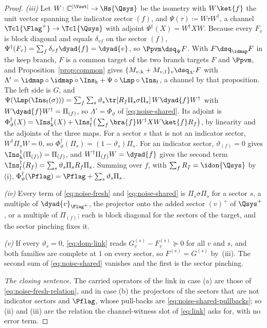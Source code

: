 \begin{proof}
\emph{(iii)} Let $W\colon\mathbb{C}^{|\Vset|}\to\Hs{\Qsys}$ be the isometry with
$W\ket{f}$ the unit vector spanning the indicator sector $(f)$, and
$\Psi(\tau)\coloneqq W\tau W^{\dagger}$, a channel
$\Tcl{\Flag^{+}}\to\Tcl{\Qsys}$ with adjoint $\Psi^{\dagger}(X)=W^{\dagger}XW$.
Because every $F_v$ is block diagonal and equals $\delta_{vf}$ on the sector
$(f)$, $\Psi^{\dagger}(F_v)=\sum_f\delta_{vf}\dyad{f}=\dyad{v}$, so
$\Ppvm\dsq_{\Psi}F$. With $F\dsq_{\idmap}F$ in the keep branch, $F$ is a
common target of the two branch targets $F$ and $\Ppvm$, and
Proposition~\ref{prop:common} gives
$\{M_{v,\mathrm{k}}+M_{v,\mathrm{f}}\}_v\dsq_{\Lambda'}F$ with
$\Lambda'=\idmap\circ\idmap\circ\Ins_{\mathrm{k}}+\Psi\circ\Lmp\circ\Ins_{\mathrm{f}}$,
a channel by that proposition. The left side is $G$, and
$\Psi(\Lmp(\Ins_{\mathrm{f}}(\sigma)))=\sum_f\sum_s\vartheta_s\tr[R_f\Pi_s\sigma\Pi_s]\,W\dyad{f}W^{\dagger}$
with $W\dyad{f}W^{\dagger}=\Pi_{(f)}$, so $\Lambda'=\Phi_{\vartheta}$ of
\eqref{eq:noise-shared}. Its adjoint is
$\Phi_{\vartheta}^{\dagger}(X)=\Ins_{\mathrm{k}}^{\dagger}(X)
+\Ins_{\mathrm{f}}^{\dagger}\big(\sum_f\bra{f}W^{\dagger}XW\ket{f}R_f\big)$,
by linearity and the adjoints of the three maps. For a sector $s$ that is not
an indicator sector, $W^{\dagger}\Pi_sW=0$, so
$\Phi_{\vartheta}^{\dagger}(\Pi_s)=(1-\vartheta_s)\Pi_s$. For an indicator sector,
$\vartheta_{(f)}=0$ gives $\Ins_{\mathrm{k}}^{\dagger}(\Pi_{(f)})=\Pi_{(f)}$, and
$W^{\dagger}\Pi_{(f)}W=\dyad{f}$ gives the second term
$\Ins_{\mathrm{f}}^{\dagger}(R_f)=\sum_s\vartheta_s\Pi_sR_f\Pi_s$. Summing over
$f$, with $\sum_fR_f=\idon{\Qsys}$ by (i),
$\Phi_{\vartheta}^{\dagger}(\Pflag)=\Pflag+\sum_s\vartheta_s\Pi_s$.

\emph{(iv)} Every term of \eqref{eq:noise-fresh} and \eqref{eq:noise-shared}
is $\Pi_s\sigma\Pi_s$ for a sector $s$, a multiple of $\dyad{v}_{\Flag^{+}}$, the
projector onto the added sector $(v)^{+}$ of $\Qsys^{+}$, or a multiple
of $\Pi_{(f)}$; each is block diagonal for the sectors of the target, and the
sector pinching fixes it.

\emph{(v)} If every $\vartheta_s=0$, \eqref{eq:dom-link} reads
$G^{(s)}_v-F^{(s)}_v\succeq0$ for all $v$ and $s$, and both families are
complete at $1$ on every sector, so $F^{(s)}=G^{(s)}$ by
\,(iii). The second sum of
\eqref{eq:noise-shared} vanishes and the first is the sector pinching.

\emph{The closing sentence.} The carried operators of the link in case (a)
are those of \eqref{eq:noise-fresh-relation}, and in case (b) the
projectors of the sectors that are not indicator sectors and $\Pflag$, whose
pull-backs are \eqref{eq:noise-shared-pullbacks}; so (ii) and (iii) are the
relation the channel-witness slot of \eqref{eq:link} asks for, with no error
term.
\end{proof}
